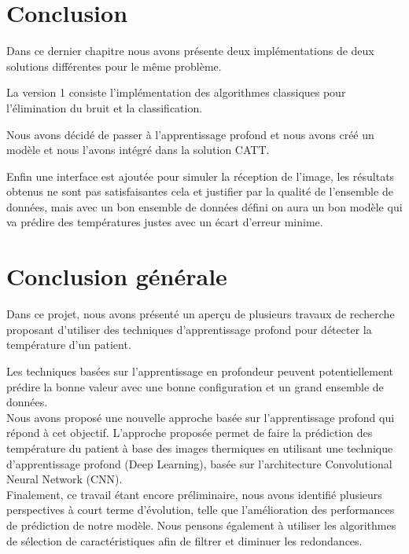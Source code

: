 \documentclass[12pt]{article}
\begin{document}
\newpage
\section{Conclusion}
Dans ce dernier chapitre nous avons présente deux implémentations de deux solutions différentes pour le même problème.

La version 1 consiste l'implémentation des algorithmes classiques pour l'élimination du bruit et la classification.

Nous avons décidé de passer à l'apprentissage profond et nous avons créé un modèle et nous l'avons intégré dans la solution CATT.

Enfin une interface est ajoutée pour simuler la réception de l'image, les résultats obtenus  ne sont pas satisfaisantes cela et justifier par la qualité de l'ensemble de données, mais avec un bon ensemble de données défini on aura un bon modèle qui va prédire des températures justes avec un écart d’erreur minime.

\newpage
{}
\section{Conclusion générale}
Dans ce projet, nous avons présenté un aperçu de plusieurs travaux de recherche proposant d'utiliser des techniques d'apprentissage profond pour détecter la température d’un patient.

Les techniques basées sur l'apprentissage en profondeur peuvent potentiellement prédire la bonne valeur avec une bonne configuration et un grand ensemble de données.\\



Nous avons proposé une nouvelle approche basée sur l’apprentissage profond qui répond à cet objectif. L’approche proposée permet de faire la prédiction des température du patient à base des images thermiques  en utilisant une technique d’apprentissage profond (Deep Learning), basée sur l’architecture Convolutional Neural Network (CNN).\\


Finalement, ce travail étant encore préliminaire, nous avons identifié plusieurs perspectives à court terme d’évolution, telle que l’amélioration des performances de prédiction de notre modèle. Nous pensons également à utiliser les algorithmes de sélection de caractéristiques afin de filtrer et diminuer les redondances.

\newpage
{}
	

	
\end{document}
